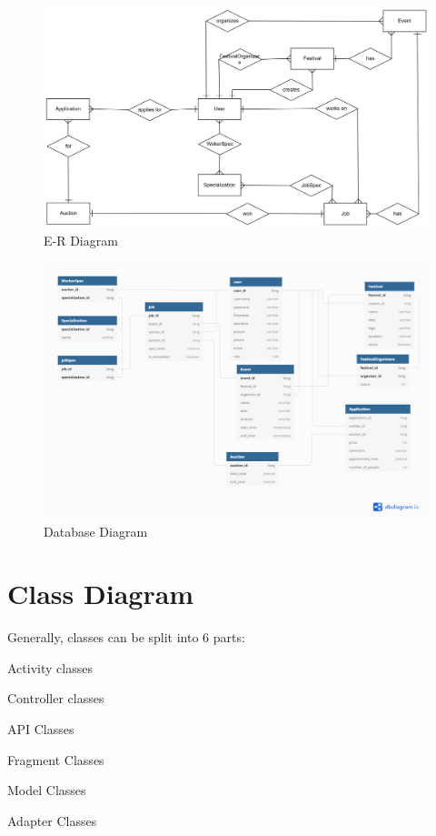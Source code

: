 				
				\begin{figure}[H]
					\includegraphics[width=\linewidth]{diagrams/db_er_diag.png}
					\centering
					\caption{E-R Diagram}
					\label{fig:er_diag}
				\end{figure}
			
				\begin{figure}[H]
					\includegraphics[width=\linewidth]{diagrams/db_normal_diag.png}
					\centering
					\caption{Database Diagram}
					\label{fig:normal_diag}
				\end{figure}
			
			\eject
			
			\pagebreak
		\section{Class Diagram}
			
			Generally, classes can be split into 6 parts:
			\begin{packed_enum}
				\item Activity classes
				\item Controller classes
				\item API Classes
				\item Fragment Classes
				\item Model Classes
				\item Adapter Classes
			\end{packed_enum}
			

